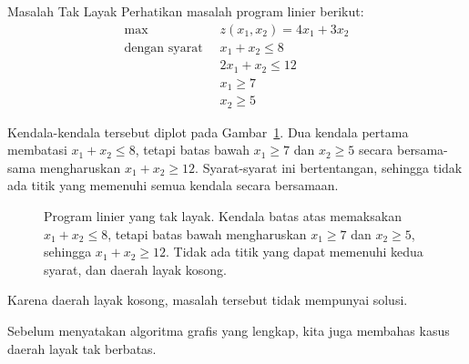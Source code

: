 \begin{example}{Masalah Tak Layak}\label{exa:LPInfeasible}
 Perhatikan masalah program linier berikut:
\begin{equation}
\begin{aligned}
\max\;\;& z(x_1,x_2) = 4x_1 + 3x_2\\
\text{dengan syarat}\;\;& x_1 + x_2 \leq 8\\
& 2x_1 + x_2 \leq 12\\
& x_1 \geq 7\\
& x_2 \geq 5
\end{aligned}
\label{eqn:LPInfeasible}
\end{equation}
\end{example}
\begin{solution}
Kendala-kendala tersebut diplot pada Gambar~\ref{fig:LPInfeasible}. Dua kendala pertama membatasi $x_1+x_2\leq 8$, tetapi batas bawah $x_1\geq 7$ dan $x_2\geq 5$ secara bersama-sama mengharuskan $x_1+x_2\geq 12$. Syarat-syarat ini bertentangan, sehingga tidak ada titik yang memenuhi semua kendala secara bersamaan.

\begin{figure}[H]
\centering
{}
\caption{Program linier yang tak layak. Kendala batas atas memaksakan $x_1+x_2\leq 8$, tetapi batas bawah mengharuskan $x_1\geq 7$ dan $x_2\geq 5$, sehingga $x_1+x_2\geq 12$. Tidak ada titik yang dapat memenuhi kedua syarat, dan daerah layak kosong.}
\label{fig:LPInfeasible}
\end{figure}

Karena daerah layak kosong, masalah tersebut tidak mempunyai solusi.
\label{ex:LPNoSoln}
\end{solution}
Sebelum menyatakan algoritma grafis yang lengkap, kita juga membahas kasus daerah layak tak berbatas.

